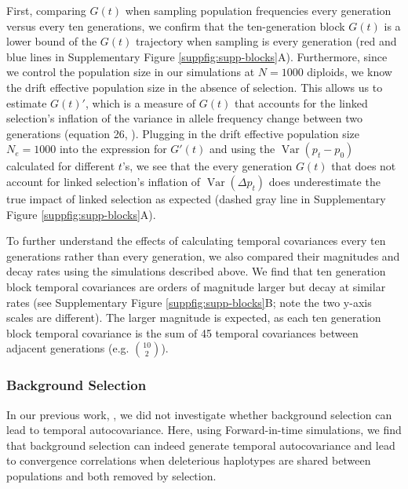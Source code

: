 \documentclass[11pt]{article}
\DeclareMathOperator{\var}{Var}
\begin{document}
{First, comparing $G(t)$ when sampling population frequencies every generation
versus every ten generations, we confirm that the ten-generation block $G(t)$
is a lower bound of the $G(t)$ trajectory when sampling is every generation
(red and blue lines in Supplementary Figure \ref{suppfig:supp-blocks}A).
Furthermore, since we control the population size in our simulations at $N =
1000$ diploids, we know the drift effective population size in the absence of
selection. This allows us to estimate $G(t)'$, which is a measure of $G(t)$
that accounts for the linked selection's inflation of the variance in allele
frequency change between two generations (equation 26, \cite{Buffalo2019-io}).
Plugging in the drift effective population size $N_e = 1000$ into the
expression for $G'(t)$ and using the $\var(p_t - p_0)$ calculated for different
$t$'s, we see that the every generation $G(t)$ that does not account for linked
selection's inflation of $\var(\Delta p_t)$ does underestimate the true impact
of linked selection as expected (dashed gray line in Supplementary Figure
\ref{suppfig:supp-blocks}A).

To further understand the effects of calculating temporal covariances every ten
generations rather than every generation, we also compared their magnitudes and
decay rates using the simulations described above. We find that ten generation
block temporal covariances are orders of magnitude larger but decay at similar
rates (see Supplementary Figure \ref{suppfig:supp-blocks}B; note the two y-axis
scales are different). The larger magnitude is expected, as each ten generation
block temporal covariance is the sum of 45 temporal covariances between
adjacent generations (e.g. $10 \choose 2$).

\subsubsection{Background Selection}

In our previous work, \textcite{Buffalo2019-io}, we did not investigate whether
background selection can lead to temporal autocovariance. Here, using
Forward-in-time simulations, we find that background selection can indeed
generate temporal autocovariance and lead to convergence correlations when
deleterious haplotypes are shared between populations and both removed by
selection. 

}
\end{document}
